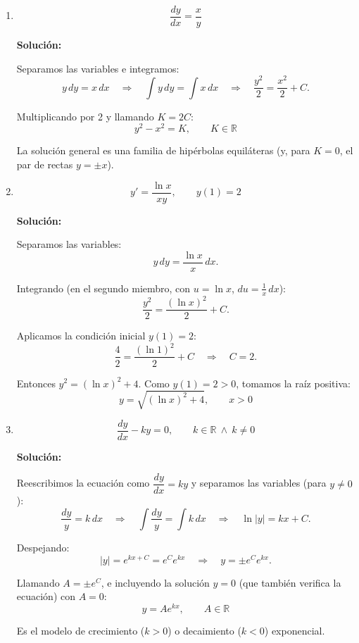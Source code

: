 \documentclass[12pt]{article}
\newcommand{\solucion}{%
    \vspace{0.8em}%
    \textbf{Solución:}%
}
\begin{document}
\begin{enumerate}[label=\alph*.-]

    \item
    \[
    \frac{dy}{dx}=\frac xy
    \]

    \solucion

    Separamos las variables e integramos:
    \[
    y\,dy=x\,dx
    \quad\Rightarrow\quad
    \int y\,dy=\int x\,dx
    \quad\Rightarrow\quad
    \frac{y^2}{2}=\frac{x^2}{2}+C.
    \]

    Multiplicando por 2 y llamando $K=2C$:
    \[
    \boxed{
    y^2-x^2=K,\qquad K\in\mathbb{R}
    }
    \]

    La solución general es una familia de hipérbolas equiláteras (y, para
    $K=0$, el par de rectas $y=\pm x$).


    \item
    \[
    y'=\frac{\ln x}{xy},\qquad y(1)=2
    \]

    \solucion

    Separamos las variables:
    \[
    y\,dy=\frac{\ln x}{x}\,dx.
    \]

    Integrando (en el segundo miembro, con $u=\ln x$, $du=\frac1x\,dx$):
    \[
    \frac{y^2}{2}=\frac{(\ln x)^2}{2}+C.
    \]

    Aplicamos la condición inicial $y(1)=2$:
    \[
    \frac{4}{2}=\frac{(\ln1)^2}{2}+C
    \quad\Rightarrow\quad
    C=2.
    \]

    Entonces $y^2=(\ln x)^2+4$. Como $y(1)=2>0$, tomamos la raíz positiva:
    \[
    \boxed{
    y=\sqrt{(\ln x)^2+4},\qquad x>0
    }
    \]


    \item
    \[
    \frac{dy}{dx}-ky=0,\qquad k\in\mathbb{R}\ \wedge\ k\neq0
    \]

    \solucion

    Reescribimos la ecuación como $\dfrac{dy}{dx}=ky$ y separamos las
    variables (para $y\neq0$):
    \[
    \frac{dy}{y}=k\,dx
    \quad\Rightarrow\quad
    \int\frac{dy}{y}=\int k\,dx
    \quad\Rightarrow\quad
    \ln|y|=kx+C.
    \]

    Despejando:
    \[
    |y|=e^{kx+C}=e^C e^{kx}
    \quad\Rightarrow\quad
    y=\pm e^Ce^{kx}.
    \]

    Llamando $A=\pm e^C$, e incluyendo la solución $y=0$ (que también
    verifica la ecuación) con $A=0$:
    \[
    \boxed{
    y=Ae^{kx},\qquad A\in\mathbb{R}
    }
    \]

    Es el modelo de crecimiento ($k>0$) o decaimiento ($k<0$) exponencial.



\end{enumerate}
\end{document}
